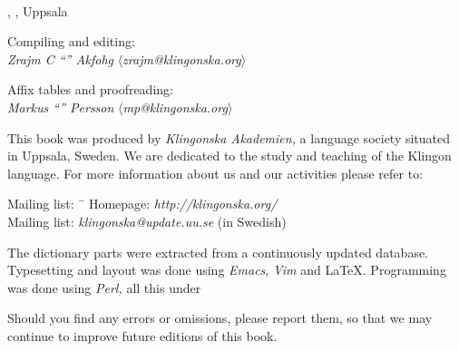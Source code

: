 %
\begin{center}
  \\
  \edition{}, \compiledate{}, Uppsala

  \vspace{4mm}
  \small Compiling and editing: \\
  \textit{Zrajm C ``'' Akfohg}
  $\langle$\textit{zrajm@klingonska.org}$\rangle$ 

  \vspace{2mm}
  Affix tables and proofreading:\\
  \textit{Markus ``'' Persson}
  $\langle$\textit{mp@klingonska.org}$\rangle$
\end{center}


\small\noindent This book was produced by \textit{Kling\-on\-ska
Aka\-demi\-en,} a language society situated in Uppsala, Sweden. We are
dedicated to the study and teaching of the Klingon language. For more
information about us and our activities please refer to:

\begin{tabbing}
\indent Mailing list: \ \= \kill
\indent Homepage: \> \textit{http://klingonska.org/}\\
\indent Mailing list: \> \textit{klingonska@update.uu.se} (in Swedish)
\end{tabbing}

\noindent The dictionary parts were extracted from a continuously
updated database. Typesetting and layout was done using
\textit{Emacs}, \textit{Vim} and \LaTeX. Programming was done using
\textit{Perl,} all this under 

Should you find any errors or omissions, please report them, so that
we may continue to improve future editions of this book.

\newpage
\normalsize
